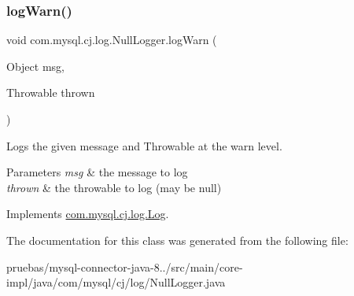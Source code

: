 \subsubsection{\texorpdfstring{log\+Warn()}{logWarn()}\hspace{0.1cm}{\footnotesize\ttfamily [2/2]}}
{\footnotesize\ttfamily void com.\+mysql.\+cj.\+log.\+Null\+Logger.\+log\+Warn (\begin{DoxyParamCaption}\item[{Object}]{msg,  }\item[{Throwable}]{thrown }\end{DoxyParamCaption})}

Logs the given message and Throwable at the \textquotesingle{}warn\textquotesingle{} level.


\begin{DoxyParams}{Parameters}
{\em msg} & the message to log \\
\hline
{\em thrown} & the throwable to log (may be null) \\
\hline
\end{DoxyParams}


Implements \mbox{\hyperlink{interfacecom_1_1mysql_1_1cj_1_1log_1_1_log_a36af866ddfdda47938c768d3d0e68572}{com.\+mysql.\+cj.\+log.\+Log}}.



The documentation for this class was generated from the following file\+:\begin{DoxyCompactItemize}
\item 
pruebas/mysql-\/connector-\/java-\/8../src/main/core-\/impl/java/com/mysql/cj/log/Null\+Logger.\+java\end{DoxyCompactItemize}
